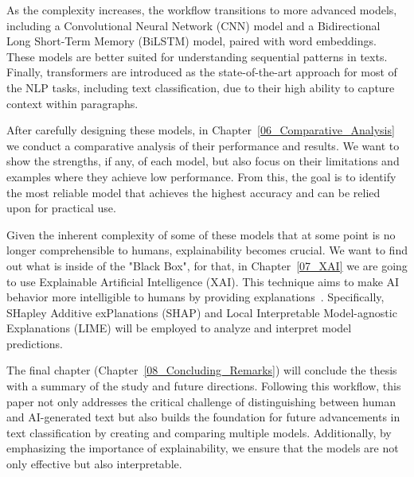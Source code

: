\vspace{3mm} 

As the complexity increases, the workflow transitions to more advanced models, including a Convolutional Neural Network (CNN) model and a Bidirectional Long Short-Term Memory (BiLSTM) model, paired with word embeddings. These models are better suited for understanding sequential patterns in texts. Finally, transformers are introduced as the state-of-the-art approach for most of the NLP tasks, including text classification, due to their high ability to capture context within paragraphs.

\vspace{3mm} 

After carefully designing these models, in Chapter~\ref{06_Comparative_Analysis} we conduct a comparative analysis of their performance and results. We want to show the strengths, if any, of each model, but also focus on their limitations and examples where they achieve low performance. From this, the goal is to identify the most reliable model that achieves the highest accuracy and can be relied upon for practical use.

\vspace{3mm} 

Given the inherent complexity of some of these models that at some point is no longer comprehensible to humans, explainability becomes crucial. We want to find out what is inside of the "Black Box", for that, in Chapter~\ref{07_XAI} we are going to use Explainable Artificial Intelligence (XAI). This technique aims to make AI behavior more intelligible to humans by providing explanations~\cite{gunning2019xai}. Specifically, SHapley Additive exPlanations (SHAP) and Local Interpretable Model-agnostic Explanations (LIME) will be employed to analyze and interpret model predictions.

\vspace{3mm} 

The final chapter (Chapter~\ref{08_Concluding_Remarks}) will conclude the thesis with a summary of the study and future directions. Following this workflow, this paper not only addresses the critical challenge of distinguishing between human and AI-generated text but also builds the foundation for future advancements in text classification by creating and comparing multiple models. Additionally, by emphasizing the importance of explainability, we ensure that the models are not only effective but also interpretable.



